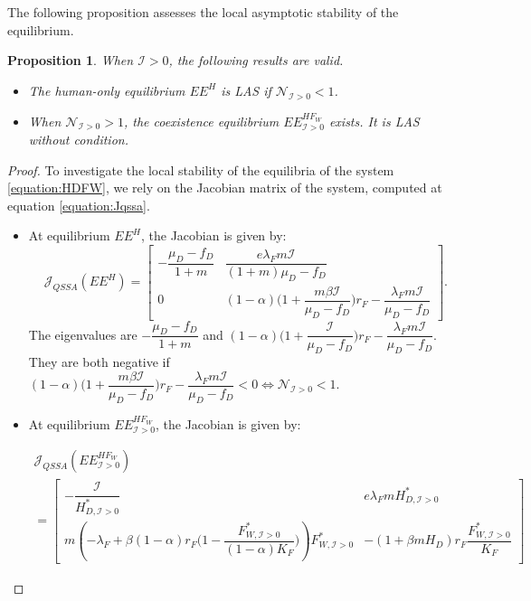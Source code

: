 \documentclass{article}
\newcommand{\lfw}{\lambda_{F}}
\newcommand{\lfw}{\lambda_{F}}
\newcommand{\cI}{\mathcal{I}}
\newtheorem{prop}[theorem]{Proposition}
\theoremstyle{definition}
\theoremstyle{remark}
\begin{document}
The following proposition assesses the local asymptotic stability of the equilibrium.

\begin{prop} \label{prop:stab 2D, cI>0}
When $\cI > 0$, the following results are valid.
\begin{itemize}
\item The human-only equilibrium $EE^{H}$ is LAS if $\mathcal{N}_{\cI > 0} < 1$.
\item When $\mathcal{N}_{\cI > 0} > 1$, the coexistence equilibrium $EE^{HF_W}_{\cI > 0}$ exists. It is LAS without condition.
\end{itemize}
\end{prop}


\begin{proof}
To investigate the local stability of the equilibria of the system \eqref{equation:HDFW}, we rely on the Jacobian matrix of the system, computed at equation \eqref{equation:Jqssa}.

\begin{itemize}
\item At equilibrium $EE^{H}$, the Jacobian is given by:
\begin{equation*}
\mathcal{J}_{QSSA}(EE^{H}) = \begin{bmatrix}
-\dfrac{\mu_D - f_D}{1 + m} &  \dfrac{e \lfw m \cI}{(1+m)\mu_D - f_D} \\
0 & (1-\alpha)\Big(1+ \dfrac{m \beta \cI}{\mu_D - f_D}\Big)  r_F -  \dfrac{\lfw m  \cI}{\mu_D - f_D}
\end{bmatrix}.
\end{equation*}
The eigenvalues are $-\dfrac{\mu_D - f_D}{1 + m} $ and $(1-\alpha)\Big(1+ \dfrac{\cI}{\mu_D - f_D}\Big)  r_F -  \dfrac{\lfw m  \cI}{\mu_D - f_D}$. They are both negative if $(1-\alpha)\Big(1+ \dfrac{m \beta \cI}{\mu_D - f_D}\Big)  r_F -  \dfrac{\lfw m  \cI}{\mu_D - f_D} <0 \Leftrightarrow \mathcal{N}_{\cI > 0} < 1$.


\item At equilibrium $EE^{HF_W}_{\cI > 0}$, the Jacobian is given by:

\begin{multline*}
\mathcal{J}_{QSSA}(EE^{HF_W}_{\cI > 0}) \\= \begin{bmatrix}
-\dfrac{\cI}{H^*_{D, \cI > 0}} & e \lfw m H^*_{D, \cI > 0} \\
m\left(-\lfw + \beta (1-\alpha) r_F \Big(1- \dfrac{F^*_{W, \cI > 0}}{(1-\alpha)K_F} \Big) \right) F^*_{W, \cI > 0} & -(1+\beta m H_D) r_F \dfrac{F^*_{W, \cI > 0}}{K_F} 
\end{bmatrix}
\end{multline*}


\end{itemize}
\end{proof}
\end{document}
